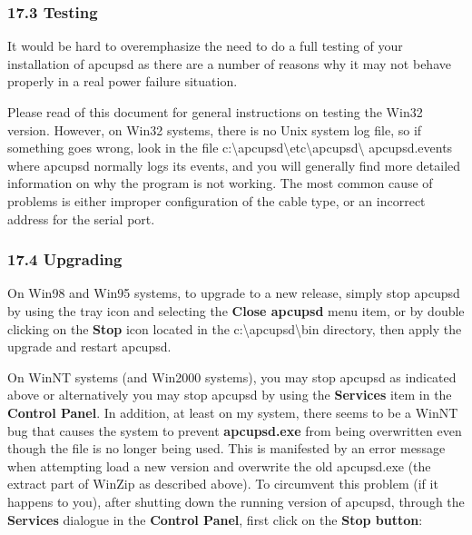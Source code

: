 {{{{{{{{{{\subsubsection*{17.3 Testing}

\label{index-Windows_002c-Testing-173}
\label{index-Testing_002c-Windows-174}
It would be hard to overemphasize the need to do a full testing of your
installation of apcupsd as there are a number of reasons why it may not behave
properly in a real power failure situation.  

Please read 
 of this document for
general instructions on testing the Win32 version. However, on Win32 systems,
there is no Unix system log file, so if something goes wrong, look in the file
c:\textbackslash{}apcupsd\textbackslash{}etc\textbackslash{}apcupsd\textbackslash
{}apcupsd.events where apcupsd normally logs its events, and you will
generally find more detailed information on why the program is not working.
The most common cause of problems is either improper configuration of the
cable type, or an incorrect address for the serial port. 

\label{Upgrading}

\subsubsection*{17.4 Upgrading}

\label{index-Windows_002c-Upgrading-175}
\label{index-Upgrading-Windows-176}
On Win98 and Win95 systems, to upgrade to a new release, simply stop apcupsd
by using the tray icon and selecting the {\bf Close apcupsd} menu item, or by
double clicking on the {\bf Stop} icon located in the
c:\textbackslash{}apcupsd\textbackslash{}bin directory, then apply the upgrade
and restart apcupsd.  

On WinNT systems (and Win2000 systems), you may stop apcupsd as indicated
above or alternatively you may stop apcupsd by using the {\bf Services} item
in the {\bf Control Panel}. In addition, at least on my system, there seems to
be a WinNT bug that causes the system to prevent {\bf apcupsd.exe} from being
overwritten even though the file is no longer being used.  This is manifested
by an error message when attempting load a new version and overwrite the old
apcupsd.exe (the extract part of WinZip as described above). To circumvent
this problem (if it happens to you), after shutting down the running version
of apcupsd, through the {\bf Services} dialogue in the {\bf Control Panel},
first click on the {\bf Stop button}:  

}}}}}}}}}}
